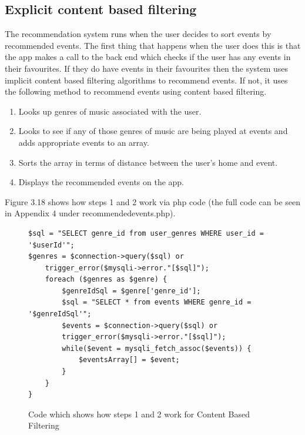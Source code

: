 \subsection{Explicit content based filtering}
The recommendation system runs when the user decides to sort events by recommended events. The first thing that happens when the user does this is that the app makes a call to the back end which checks if the user has any events in their favourites. If they do have events in their favourites then the system uses implicit content based filtering algorithms to recommend events. If not, it uses the following method to recommend events using content based filtering.
\begin{enumerate}
  \item Looks up genres of music associated with the user.
  \item Looks to see if any of those genres of music are being played at events and adds appropriate events to an array.
  \item Sorts the array in terms of distance between the user's home and event.
  \item Displays the recommended events on the app.
\end{enumerate}
Figure 3.18 shows how steps 1 and 2 work via php code (the full code can be seen in Appendix 4 under recommendedevents.php).
\begin{figure}[H]
\begin{verbatim}
$sql = "SELECT genre_id from user_genres WHERE user_id = '$userId'";
$genres = $connection->query($sql) or 
    trigger_error($mysqli->error."[$sql]");
    foreach ($genres as $genre) {
        $genreIdSql = $genre['genre_id'];
        $sql = "SELECT * from events WHERE genre_id = '$genreIdSql'";
        $events = $connection->query($sql) or 
        trigger_error($mysqli->error."[$sql]");
        while($event = mysqli_fetch_assoc($events)) {
            $eventsArray[] = $event;
        }
    }
}
\end{verbatim}
\caption{Code which shows how steps 1 and 2 work for Content Based Filtering}
\end{figure}

